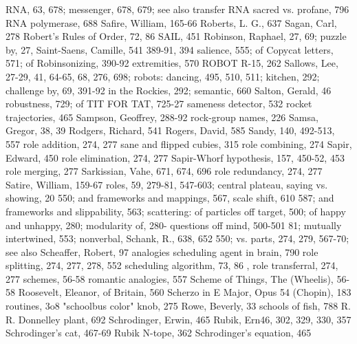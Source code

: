 RNA, 63, 678; messenger, 678, 679; see also
 transfer RNA                                   sacred vs. profane, 796
RNA polymerase, 688                             Safire, William, 165-66
Roberts, L. G., 637                             Sagan, Carl, 278
Robert's Rules of Order, 72, 86                 SAIL, 451
Robinson, Raphael, 27, 69; puzzle by, 27,       Saint-Saens, Camille, 541
 389-91, 394                                    salience, 555; of Copycat letters, 571; of
Robinsonizing, 390-92                            extremities, 570
ROBOT R-15, 262                                 Sallows, Lee, 27-29, 41, 64-65, 68, 276, 698;
robots: dancing, 495, 510, 511; kitchen, 292;    challenge by, 69, 391-92
 in the Rockies, 292; semantic, 660             Salton, Gerald, 46
robustness, 729; of TIT FOR TAT, 725-27         sameness detector, 532
rocket trajectories, 465                        Sampson, Geoffrey, 288-92
rock-group names, 226                           Samsa, Gregor, 38, 39
Rodgers, Richard, 541 Rogers, David, 585        Sandy, 140, 492-513, 557
role addition, 274, 277                         sane and flipped cubies, 315
role combining, 274                             Sapir, Edward, 450
role elimination, 274, 277                      Sapir-Whorf hypothesis, 157, 450-52, 453
role merging, 277                               Sarkissian, Vahe, 671, 674, 696
role redundancy, 274, 277                       Satire, William, 159-67
roles, 59, 279-81, 547-603; central plateau,    saying vs. showing, 20
 550; and frameworks and mappings, 567,         scale shift, 610
 587; and frameworks and slippability, 563;     scattering: of particles off target, 500; of
 happy and unhappy, 280; modularity of, 280-     questions off mind, 500-501
 81; mutually intertwined, 553; nonverbal,      Schank, R., 638, 652
 550; vs. parts, 274, 279, 567-70; see also     Scheaffer, Robert, 97
 analogies                                      scheduling agent in brain, 790
role splitting, 274, 277, 278, 552              scheduling algorithm, 73, 86 ,
role transferral, 274, 277                      schemes, 56-58
romantic analogies, 557                         Scheme of Things, The (Wheelis), 56-58
Roosevelt, Eleanor, of Britain, 560             Scherzo in E Major, Opus 54 (Chopin), 183
routines, 3o8                                   "schoolbus color" knob, 275
Rowe, Beverly, 33                               schools of fish, 788
R. R. Donnelley plant, 692                      Schrodinger, Erwin, 465
Rubik, Ern46, 302, 329, 330, 357                Schrodinger's cat, 467-69
Rubik N-tope, 362                               Schrodinger's equation, 465
